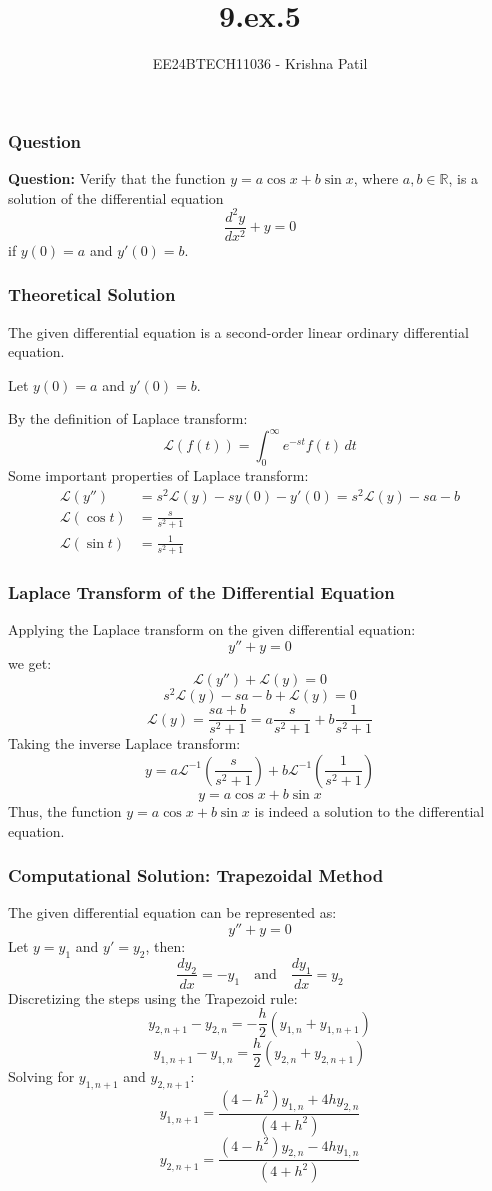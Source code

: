 \documentclass{beamer}
\title{9.ex.5}
\author{EE24BTECH11036 - Krishna Patil}
\date{}
\begin{document}
\begin{frame}
\titlepage
\end{frame}

\begin{frame}
\frametitle{Question}
\textbf{Question:} Verify that the function \( y = a \cos{x} + b \sin{x} \), where \( a, b \in \mathbb{R} \), is a solution of the differential equation 
\[
\frac{d^2y}{dx^2} + y = 0 
\]
if \( y(0) = a \) and \( y'(0) = b \).
\end{frame}

\begin{frame}
\frametitle{Theoretical Solution}
The given differential equation is a second-order linear ordinary differential equation.

Let \( y(0) = a \) and \( y'(0) = b \).

By the definition of Laplace transform:
\[
\mathcal{L}\left(f(t)\right) = \int_0^{\infty} e^{-st} f(t) \, dt
\]
Some important properties of Laplace transform:
\begin{align*}
    \mathcal{L}\left(y''\right) &= s^2 \mathcal{L}\left(y\right) - s y(0) - y'(0) = s^2 \mathcal{L}\left(y\right) - sa - b \\
    \mathcal{L}\left(\cos{t}\right) &= \frac{s}{s^2 + 1} \\
    \mathcal{L}\left(\sin{t}\right) &= \frac{1}{s^2 + 1}
\end{align*}
\end{frame}

\begin{frame}
\frametitle{Laplace Transform of the Differential Equation}
Applying the Laplace transform on the given differential equation:
\[
y'' + y = 0
\]
we get:
\[
\mathcal{L}\left(y''\right) + \mathcal{L}\left(y\right) = 0
\]
\[
s^2 \mathcal{L}\left(y\right) - sa - b + \mathcal{L}\left(y\right) = 0
\]
\[
\mathcal{L}\left(y\right) = \frac{sa + b}{s^2 + 1} = a\frac{s}{s^2 + 1} + b\frac{1}{s^2 + 1}
\]
Taking the inverse Laplace transform:
\[
y = a \mathcal{L}^{-1}\left(\frac{s}{s^2 + 1}\right) + b \mathcal{L}^{-1}\left(\frac{1}{s^2 + 1}\right)
\]
\[
y = a \cos{x} + b \sin{x}
\]
Thus, the function \( y = a \cos{x} + b \sin{x} \) is indeed a solution to the differential equation.
\end{frame}

\begin{frame}
\frametitle{Computational Solution: Trapezoidal Method}
The given differential equation can be represented as:
\[
y'' + y = 0
\]
Let \( y = y_1 \) and \( y' = y_2 \), then:
\[
\frac{dy_2}{dx} = -y_1 \quad \text{and} \quad \frac{dy_1}{dx} = y_2
\]
Discretizing the steps using the Trapezoid rule:
\[
y_{2, n + 1} - y_{2, n} = -\frac{h}{2}(y_{1, n} + y_{1, n + 1})
\]
\[
y_{1, n + 1} - y_{1, n} = \frac{h}{2}(y_{2, n} + y_{2, n + 1})
\]
Solving for \( y_{1, n + 1} \) and \( y_{2, n + 1} \):
\[
y_{1, n + 1} = \frac{(4 - h^2) y_{1, n} + 4 h y_{2, n}}{(4 + h^2)}
\]
\[
y_{2, n + 1} = \frac{(4 - h^2) y_{2, n} - 4 h y_{1, n}}{(4 + h^2)}
\]
\end{frame}
\end{document}
